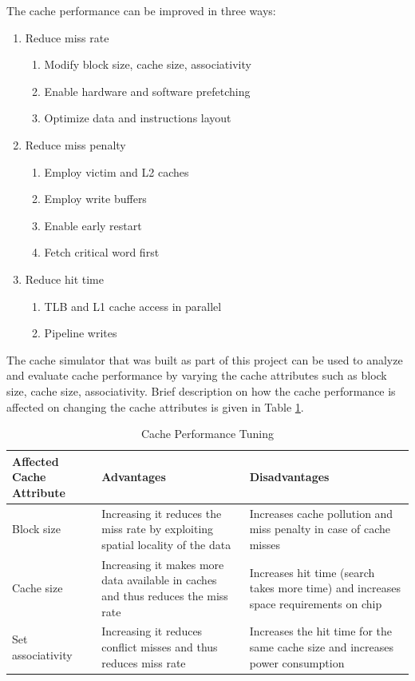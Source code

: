 \documentclass[a4paper]{article}
\begin{document}
The cache performance can be improved in three ways:
\begin{enumerate}
    \item Reduce miss rate
    \begin{enumerate}
        \item Modify block size, cache size, associativity
        \item Enable hardware and software prefetching
        \item Optimize data and instructions layout
    \end{enumerate}
    \item Reduce miss penalty
    \begin{enumerate}
        \item Employ victim and L2 caches
        \item Employ write buffers
        \item Enable early restart
        \item Fetch critical word first
    \end{enumerate}
    \item Reduce hit time
    \begin{enumerate}
        \item TLB and L1 cache access in parallel
        \item Pipeline writes
    \end{enumerate}
\end{enumerate}

The cache simulator that was built as part of this project can be used to analyze and evaluate cache performance by varying the cache attributes such as block size, cache size, associativity. Brief description on how the cache performance is affected on changing the cache attributes is given in Table \ref{tab:perf_metrics}.

\begin{table}[h!]
    \centering
    \begin{center}
        \begin{tabular}{|p{3cm}|p{6cm}|p{6cm}|}
            \hline
            \bf Affected Cache Attribute & \bf Advantages & \bf Disadvantages \\ \hline
            Block size &  Increasing it reduces the miss rate by exploiting spatial locality of the data & Increases cache pollution and miss penalty in case of cache misses \\ \hline
            Cache size & Increasing it makes more data available in caches and thus reduces the miss rate & Increases hit time (search takes more time) and increases space requirements on chip \\ \hline
            Set associativity & Increasing it reduces conflict misses and thus reduces miss rate & Increases the hit time for the same cache size and increases power consumption \\ \hline
        \end{tabular}
        \captionsetup{justification=centering}
        \caption{Cache Performance Tuning}
        \label{tab:perf_metrics}
    \end{center}
\end{table}
\end{document}
